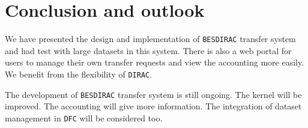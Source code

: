 \section{Conclusion and outlook}
We have presented the design and implementation of {\tt BESDIRAC} transfer system
and had test with large datasets in this system.
There is also a web portal for users to manage their own transfer requests
and view the accounting more easily.
We benefit from the flexibility of {\tt DIRAC}.

The development of {\tt BESDIRAC} transfer system is still ongoing.
The kernel will be improved.
The accounting will give more information.
The integration of dataset management in {\tt DFC} will be considered too.

